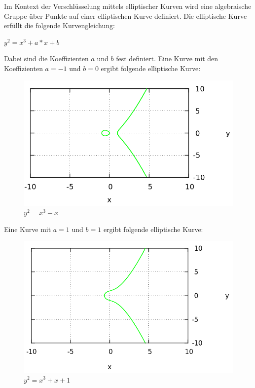 Im Kontext der Verschlüsselung mittels elliptischer Kurven wird eine algebraische Gruppe über Punkte
auf einer elliptischen Kurve definiert. 
Die elliptische Kurve erfüllt die folgende Kurvengleichung:

\begin{center}
$y^2 = x^3 + a*x + b$
\end{center}

Dabei sind die Koeffizienten $a$ und $b$ fest definiert.
Eine Kurve mit den Koeffizienten $a = -1$ und $b = 0$ ergibt folgende elliptische Kurve:

\begin{figure}[H]
	\begin{center}
		\includegraphics[keepaspectratio=true, scale=0.4]{./pictures/example_curve_1a.png}
	\end{center}
	\caption{$y^2 = x^3 -x$}\label{example_1}
\end{figure}

\newpage

Eine Kurve mit $a = 1$ und $b = 1$ ergibt folgende elliptische Kurve:

\begin{figure}[H]
	\begin{center}
		\includegraphics[keepaspectratio=true, scale=0.4]{./pictures/example_curve_2a.png}
	\end{center}
	\caption{$y^2 = x^3 +x +1$}\label{example_2}
\end{figure}


